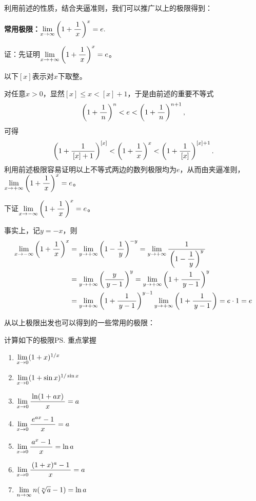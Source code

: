 利用前述的性质，结合夹逼准则，我们可以推广以上的极限得到：
\begin{thx}
	{\bf 常用极限：}$\limx{\infty}\left(1+\df1x\right)^x=e.$
\end{thx}

证：先证明$\limx{+\infty}\left(1+\df1x\right)^x=e$。

以下$[x]$表示对$x$下取整。

对任意$x>0$，显然$[x]\leq x<[x]+1$，于是由前述的重要不等式
$$\left(1+\df1n\right)^n<e<\left(1+\df1n\right)^{n+1},$$
可得
$$\left(1+\df1{[x]+1}\right)^{[x]}<\left(1+\df1x\right)^x
<\left(1+\df1{[x]}\right)^{[x]+1}.$$
利用前述极限容易证明以上不等式两边的数列极限均为$e$，从而由夹逼准则，
$\limx{+\infty}\left(1+\df1x\right)^x=e$。

下证$\limx{-\infty}\left(1+\df1x\right)^x=e$。

事实上，记$y=-x$，则
\begin{align*}
	\limx{-\infty}\left(1+\df1x\right)^x
	&=\lim\limits_{y\to+\infty}\left(1-\df1y\right)^{-y}
	=\lim\limits_{y\to+\infty}\df1{\left(1-\df1y\right)^{y}}\\
	&=\lim\limits_{y\to+\infty}\left(\df y{y-1}\right)^{y}
	=\lim\limits_{y\to+\infty}\left(1+\df1{y-1}\right)^{y}\\
	&=\lim\limits_{y\to+\infty}\left(1+\df1{y-1}\right)^{y-1}
	\lim\limits_{y\to+\infty}\left(1+\df1{y-1}\right)=e\cdot1=e
\end{align*}
\fin

\bs
从以上极限出发也可以得到的一些常用的极限：

\egz 计算如下的极限\ps{\baa 重点掌握}
\begin{enumerate}[(1)]
   \setlength{\itemindent}{1cm}
  \item $\limx{0}(1+x)^{1/x}$ 
  \item $\limx 0(1+\sin x)^{1/\sin x}$ 
  \item $\limx 0\df{\ln(1+ax)}{x}=a$
  \item $\limx 0\df{e^{ax}-1}{x}=a$ 
  \item $\limx 0\df{a^x-1}{x}=\ln a$ 
  \item $\limx 0\df{(1+x)^a-1}x=a$
  \item $\limn n(\sqrt[n]{a}-1)=\ln a$ 
\end{enumerate}

